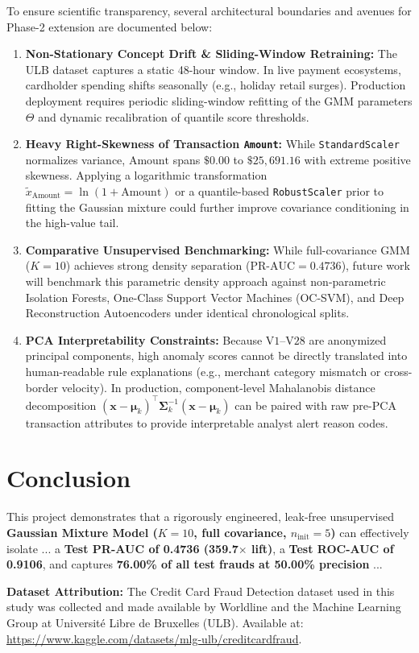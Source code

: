 \documentclass[11pt, a4paper]{article}
\begin{document}
To ensure scientific transparency, several architectural boundaries and avenues for Phase-2 extension are documented below:

\begin{enumerate}
    \item \textbf{Non-Stationary Concept Drift \& Sliding-Window Retraining:} The ULB dataset captures a static 48-hour window. In live payment ecosystems, cardholder spending shifts seasonally (e.g., holiday retail surges). Production deployment requires periodic sliding-window refitting of the GMM parameters $\Theta$ and dynamic recalibration of quantile score thresholds.
    \item \textbf{Heavy Right-Skewness of Transaction \texttt{Amount}:} While \texttt{StandardScaler} normalizes variance, $\text{Amount}$ spans $\$0.00$ to $\$25,691.16$ with extreme positive skewness. Applying a logarithmic transformation $\tilde{x}_{\text{Amount}} = \ln(1 + \text{Amount})$ or a quantile-based \texttt{RobustScaler} prior to fitting the Gaussian mixture could further improve covariance conditioning in the high-value tail.
    \item \textbf{Comparative Unsupervised Benchmarking:} While full-covariance GMM ($K=10$) achieves strong density separation ($\text{PR-AUC} = 0.4736$), future work will benchmark this parametric density approach against non-parametric Isolation Forests, One-Class Support Vector Machines (OC-SVM), and Deep Reconstruction Autoencoders under identical chronological splits.
    \item \textbf{PCA Interpretability Constraints:} Because $\text{V1}$--$\text{V28}$ are anonymized principal components, high anomaly scores cannot be directly translated into human-readable rule explanations (e.g., merchant category mismatch or cross-border velocity). In production, component-level Mahalanobis distance decomposition $(\mathbf{x} - \boldsymbol{\mu}_k)^{\top}\boldsymbol{\Sigma}_k^{-1}(\mathbf{x} - \boldsymbol{\mu}_k)$ can be paired with raw pre-PCA transaction attributes to provide interpretable analyst alert reason codes.
\end{enumerate}

\section{Conclusion}

This project demonstrates that a rigorously engineered, leak-free unsupervised \textbf{Gaussian Mixture Model ($K=10$, full covariance, $n_{\text{init}}=5$)} can effectively isolate ...
a \textbf{Test PR-AUC of 0.4736 (359.7$\times$ lift)}, a \textbf{Test ROC-AUC of 0.9106}, and captures \textbf{76.00\% of all test frauds at 50.00\% precision} ...

\vspace{0.5cm}
\noindent\textbf{Dataset Attribution:} The Credit Card Fraud Detection dataset used in this study was collected and made available by Worldline and the Machine Learning Group at Universit\'{e} Libre de Bruxelles (ULB). Available at: \url{https://www.kaggle.com/datasets/mlg-ulb/creditcardfraud}.
\end{document}
